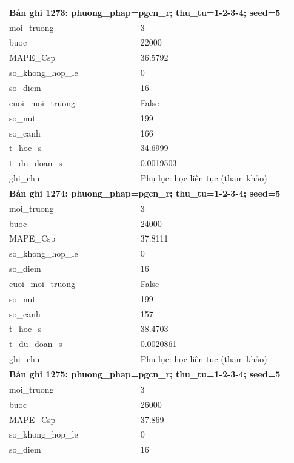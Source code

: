 \begin{longtable}{p{0.43\linewidth}p{0.50\linewidth}}
\midrule
\multicolumn{2}{p{0.95\linewidth}}{\textbf{Bản ghi 1273: phuong\_phap=pgcn\_r; thu\_tu=1-2-3-4; seed=5}} \\
moi\_\allowbreak truong & 3 \\
buoc & 22000 \\
MAPE\_\allowbreak Csp & 36.5792 \\
so\_\allowbreak khong\_\allowbreak hop\_\allowbreak le & 0 \\
so\_\allowbreak diem & 16 \\
cuoi\_\allowbreak moi\_\allowbreak truong & False \\
so\_\allowbreak nut & 199 \\
so\_\allowbreak canh & 166 \\
t\_\allowbreak hoc\_\allowbreak s & 34.6999 \\
t\_\allowbreak du\_\allowbreak doan\_\allowbreak s & 0.0019503 \\
ghi\_\allowbreak chu & Phụ lục: học liên tục (tham khảo) \\
\midrule
\multicolumn{2}{p{0.95\linewidth}}{\textbf{Bản ghi 1274: phuong\_phap=pgcn\_r; thu\_tu=1-2-3-4; seed=5}} \\
moi\_\allowbreak truong & 3 \\
buoc & 24000 \\
MAPE\_\allowbreak Csp & 37.8111 \\
so\_\allowbreak khong\_\allowbreak hop\_\allowbreak le & 0 \\
so\_\allowbreak diem & 16 \\
cuoi\_\allowbreak moi\_\allowbreak truong & False \\
so\_\allowbreak nut & 199 \\
so\_\allowbreak canh & 157 \\
t\_\allowbreak hoc\_\allowbreak s & 38.4703 \\
t\_\allowbreak du\_\allowbreak doan\_\allowbreak s & 0.0020861 \\
ghi\_\allowbreak chu & Phụ lục: học liên tục (tham khảo) \\
\midrule
\multicolumn{2}{p{0.95\linewidth}}{\textbf{Bản ghi 1275: phuong\_phap=pgcn\_r; thu\_tu=1-2-3-4; seed=5}} \\
moi\_\allowbreak truong & 3 \\
buoc & 26000 \\
MAPE\_\allowbreak Csp & 37.869 \\
so\_\allowbreak khong\_\allowbreak hop\_\allowbreak le & 0 \\
so\_\allowbreak diem & 16 \\

\end{longtable}
